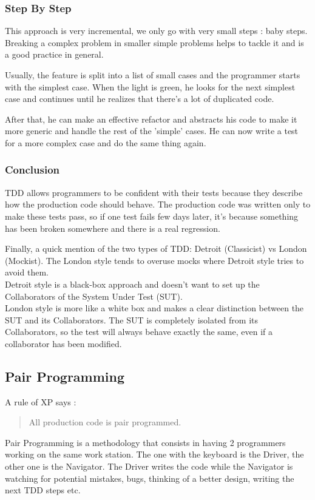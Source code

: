 \subsubsection{Step By Step}
This approach is very incremental, we only go with very small steps :
baby steps.
Breaking a complex problem in smaller simple problems helps to tackle it
and is a good practice in general.

Usually, the feature is split into a list of small cases and the
programmer starts with the simplest case.
When the light is green, he looks for the next simplest case and
continues until he realizes that there's a lot of duplicated code.

After that, he can make an effective refactor and abstracts his code to
make it more generic and handle the rest of the 'simple' cases.
He can now write a test for a more complex case and do the same thing
again.

\subsubsection{Conclusion}
TDD allows programmers to be confident with their tests because they
describe how the production code should behave.
The production code was written only to make these tests pass, so if
one test fails few days later, it's because something has been broken
somewhere and there is a real regression.

Finally, a quick mention of the two types of TDD: Detroit (Classicist)
vs London (Mockist).
The London style tends to overuse mocks where Detroit style tries to avoid them.
\\
Detroit style is a black-box approach and doesn't want to set up the
Collaborators of the System Under Test (SUT).
\\
London style is more like a white box and makes a clear distinction
between the SUT and its Collaborators.
The SUT is completely isolated from its Collaborators, so the test will
always behave exactly the same, even if a collaborator has been modified.

\subsection{Pair Programming}\label{subsec:pair-programming}
A rule of XP says :
\begin{quotation}
    All production code is pair programmed.
\end{quotation}
Pair Programming is a methodology that consists in having 2 programmers
working on the same work station.
The one with the keyboard is the Driver, the other one is the Navigator.
The Driver writes the code while the Navigator is watching for potential
mistakes, bugs, thinking of a better design, writing the next TDD steps
etc.

